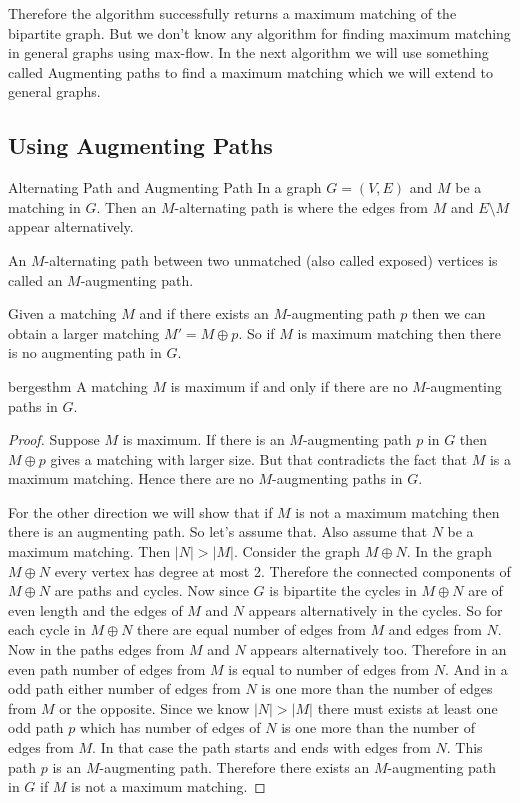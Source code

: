 Therefore the algorithm successfully returns a maximum matching of the bipartite graph. But we don't know any algorithm for finding maximum matching in general graphs using max-flow. In the next algorithm we will use something called Augmenting paths to find a maximum matching which we will extend to general graphs.
\subsection{Using Augmenting Paths}\label{section:bp-augment-path}
\begin{Definition}{Alternating Path and Augmenting Path}{}
	In a graph $G=(V,E)$ and $M$ be a matching in $G$. Then an $M$-alternating path is where the edges from $M$ and $E\setminus M$ appear alternatively.\parinn
	
	An $M$-alternating path between two unmatched (also called exposed) vertices is called an $M$-augmenting path. 
\end{Definition}

Given a matching $M$ and if there exists an $M$-augmenting path $p$ then we can obtain a larger matching $M'=M\oplus p$.  So if $M$ is maximum matching then there is no augmenting path in $G$.
\begin{Theorem}{}{bergesthm}
	A matching $M$ is maximum if and only if there are no $M$-augmenting paths in $G$.
\end{Theorem}
\begin{proof}
	Suppose $M$ is maximum. If there is an $M$-augmenting path $p$ in $G$ then $M\oplus p$  gives a matching with larger size. But that contradicts the fact that $M$ is a maximum matching. Hence there are no $M$-augmenting paths in $G$.
	
	For the other direction we will show that if $M$ is not a maximum matching then there is an augmenting path. So let's assume that. Also assume that $N$ be a maximum matching. Then $|N|>|M|$. Consider the graph $M\oplus N$. In the graph $M\oplus N$ every vertex has degree at most 2. Therefore the connected components of $M\oplus N$ are paths and cycles. Now since $G$ is bipartite the cycles in $M\oplus N$ are of even length and the edges of $M$ and $N$ appears alternatively in the cycles. So for each cycle in $M\oplus N$ there are equal number of edges from $M$ and edges from $N$. Now in the paths edges from $M$ and $N$ appears alternatively  too. Therefore in an even path number of edges from $M$ is equal to number of edges from $N$. And in a odd path either number of edges from $N$ is one more than the number of edges from $M$ or the opposite. Since we know $|N|>|M|$ there must exists at least one odd path $p$ which has number of edges of $N$ is one more than the number of edges from $M$. In that case the path starts and ends with edges from $N$. This path $p$ is an $M$-augmenting path. Therefore there exists an $M$-augmenting path in $G$ if $M$ is not a maximum matching. 
\end{proof}


